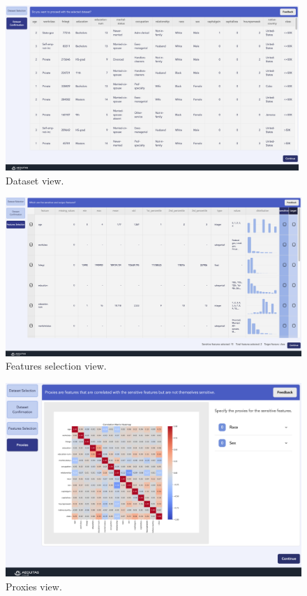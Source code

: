 \documentclass[12pt,a4paper,openright,twoside]{book}
\begin{document}
\begin{figure}
    \centering
    \includegraphics[width=0.99\textwidth]{figures/gui/dataset-view.png}
    \caption{Dataset view.}
    \label{fig:dataset}
\end{figure}

\begin{figure}
    \centering
    \includegraphics[width=\textwidth]{figures/gui/features.png}
    \caption{Features selection view.}
    \label{fig:features}
\end{figure}

\begin{figure}
    \centering
    \includegraphics[width=\textwidth]{figures/gui/proxies.png}
    \caption{Proxies view.}
    \label{fig:proxies}
\end{figure}
\end{document}
